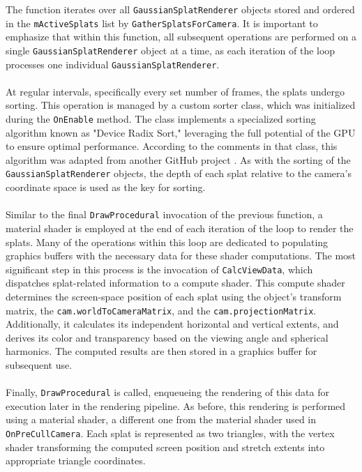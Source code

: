 \documentclass[12pt]{article}
\begin{document}
The function iterates over all \texttt{GaussianSplatRenderer} objects stored and ordered in the \texttt{m\textunderscore ActiveSplats} list by \texttt{GatherSplatsForCamera}. It is important to emphasize that within this function, all subsequent operations are performed on a single \texttt{GaussianSplatRenderer} object at a time, as each iteration of the loop processes one individual \texttt{GaussianSplatRenderer}.\\\\
At regular intervals, specifically every set number of frames, the splats undergo sorting. This operation is managed by a custom sorter class, which was initialized during the \texttt{OnEnable} method. The class implements a specialized sorting algorithm known as "Device Radix Sort," leveraging the full potential of the GPU to ensure optimal performance. According to the comments in that class, this algorithm was adapted from another GitHub project \parencite{Sorting}. As with the sorting of the \texttt{GaussianSplatRenderer} objects, the depth of each splat relative to the camera’s coordinate space is used as the key for sorting.
\\\\
Similar to the final \texttt{DrawProcedural} invocation of the previous function, a material shader is employed at the end of each iteration of the loop to render the splats. Many of the operations within this loop are dedicated to populating graphics buffers with the necessary data for these shader computations. The most significant step in this process is the invocation of \texttt{CalcViewData}, which dispatches splat-related information to a compute shader. This compute shader determines the screen-space position of each splat using the object's transform matrix, the \texttt{cam.worldToCameraMatrix}, and the \texttt{cam.projectionMatrix}. Additionally, it calculates its independent horizontal and vertical extents, and derives its color and transparency based on the viewing angle and spherical harmonics. The computed results are then stored in a graphics buffer for subsequent use. \\\\
Finally, \texttt{DrawProcedural} is called, enqueueing the rendering of this data for execution later in the rendering pipeline. As before, this rendering is performed using a material shader, a different one from the material shader used in \texttt{OnPreCullCamera}. Each splat is represented as two triangles, with the vertex shader transforming the computed screen position and stretch extents into appropriate triangle coordinates.
\end{document}
